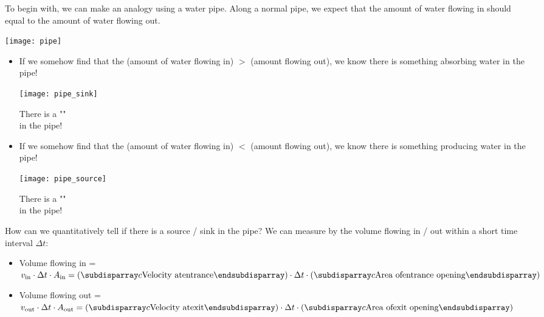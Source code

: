 \documentclass[class=article, crop=false, 12pt]{standalone}
\begin{document}
To begin with, we can make an analogy using a water pipe.
Along a normal pipe, we expect that the amount of water flowing in
should equal to the amount of water flowing out.
\begin{center}
    \begin{minipage}{0.27\linewidth}
        \centering
        \texttt{[image: pipe]}
    \end{minipage}
\end{center}

\begin{itemize}
    \item If we somehow find that the (amount of water flowing in) $>$ (amount flowing out),
    we know there is something absorbing water in the pipe!
    \begin{center}
        \begin{minipage}{0.3\linewidth}
            \centering
            \texttt{[image: pipe\_sink]}
        \end{minipage}
        \begin{minipage}{0.3\linewidth}
            \centering
            There is a ""\\ in the pipe!
        \end{minipage}
    \end{center}

    \item If we somehow find that the (amount of water flowing in) $<$ (amount flowing out),
    we know there is something producing water in the pipe!
    \begin{center}
        \begin{minipage}{0.3\linewidth}
            \centering
            \texttt{[image: pipe\_source]}
        \end{minipage}
        \begin{minipage}{0.3\linewidth}
            \centering
            There is a ""\\ in the pipe!
        \end{minipage}
    \end{center}

\end{itemize}

How can we quantitatively tell if there is a source / sink in the pipe?
We can measure by the volume flowing in / out within a short time interval $\Delta t$:
\begin{itemize}
    \item Volume flowing in = $v_\text{in}\cdot \Delta t \cdot A_\text{in} 
    = \qty(\mstack{\text{Velocity at}\\\text{entrance}})\cdot \Delta t \cdot \qty(\mstack{\text{Area of}\\\text{entrance opening}})$

    \item Volume flowing out = $v_\text{out}\cdot \Delta t \cdot A_\text{out}
     = \qty(\mstack{\text{Velocity at}\\\text{exit}})\cdot \Delta t \cdot \qty(\mstack{\text{Area of}\\\text{exit opening}})$
\end{itemize}
\end{document}
